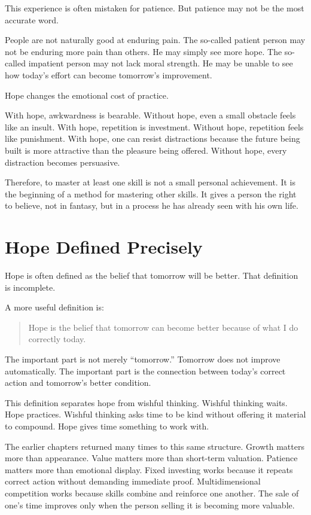 This experience is often mistaken for patience. But patience may not be the most accurate word.

People are not naturally good at enduring pain. The so-called patient person may not be enduring more pain than others. He may simply see more hope. The so-called impatient person may not lack moral strength. He may be unable to see how today's effort can become tomorrow's improvement.

Hope changes the emotional cost of practice.

With hope, awkwardness is bearable. Without hope, even a small obstacle feels like an insult. With hope, repetition is investment. Without hope, repetition feels like punishment. With hope, one can resist distractions because the future being built is more attractive than the pleasure being offered. Without hope, every distraction becomes persuasive.

Therefore, to master at least one skill is not a small personal achievement. It is the beginning of a method for mastering other skills. It gives a person the right to believe, not in fantasy, but in a process he has already seen with his own life.

\section*{Hope Defined Precisely}

Hope is often defined as the belief that tomorrow will be better. That definition is incomplete.

A more useful definition is:

\begin{quote}
Hope is the belief that tomorrow can become better because of what I do correctly today.
\end{quote}

The important part is not merely ``tomorrow.'' Tomorrow does not improve automatically. The important part is the connection between today's correct action and tomorrow's better condition.

This definition separates hope from wishful thinking. Wishful thinking waits. Hope practices. Wishful thinking asks time to be kind without offering it material to compound. Hope gives time something to work with.

The earlier chapters returned many times to this same structure. Growth matters more than appearance. Value matters more than short-term valuation. Patience matters more than emotional display. Fixed investing works because it repeats correct action without demanding immediate proof. Multidimensional competition works because skills combine and reinforce one another. The sale of one's time improves only when the person selling it is becoming more valuable.

